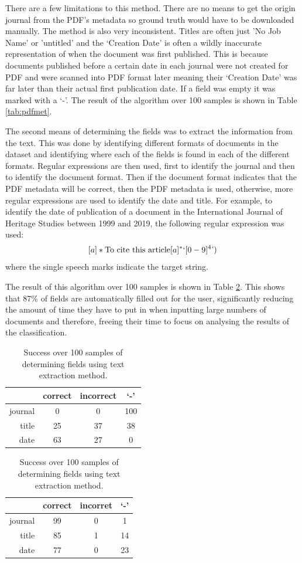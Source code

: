 				There are a few limitations to this method. There are no means to get the origin journal from the PDF's metadata so ground truth would have to be downloaded manually. The method is also very inconsistent. Titles are often just 'No Job Name' or 'untitled' and the `Creation Date' is often a wildly inaccurate representation of when the document was first published. This is because documents published before a certain date in each journal were not created for PDF and were scanned into PDF format later meaning their `Creation Date' was far later than their actual first publication date. If a field was empty it was marked with a `-'. The result of the algorithm over 100 samples is shown in Table \ref{tab:pdfmet}.
				
				The second means of determining the fields was to extract the information from the text. This was done by identifying different formats of documents in the dataset and identifying where each of the fields is found in each of the different formats. Regular expressions are then used, first to identify the journal and then to identify the document format. Then if the document format indicates that the PDF metadata will be correct, then the PDF metadata is used, otherwise, more regular expressions are used to identify the date and title. For example, to identify the date of publication of a document in the International Journal of Heritage Studies between 1999 and 2019, the following regular expression was used: \[[a]*\textnormal{To cite this article}[a]^*\textnormal{`}[0-9]^4\textnormal{'})\] where the single speech marks indicate the target string. 
				
				The result of this algorithm over 100 samples is shown in Table \ref{tab:textmet}. This shows that 87\% of fields are automatically filled out for the user, significantly reducing the amount of time they have to put in when inputting large numbers of documents and therefore, freeing their time to focus on analysing the results of the classification.
			\begin{table}
				\parbox{.45\linewidth}{
					\centering
					\begin{tabular}{r|c|c|c}
						\hline
						&correct&incorrect&`-'\\
						\hline
						journal&0&0&100\\
						title&25&37&38\\
						date&63&27&0
					\end{tabular}
					\caption{Success over 100 samples of determining fields using PDF method.}\label{tab:pdfmet}
				}
				\hfill
				\parbox{.45\linewidth}{
					\centering
					\begin{tabular}{r|c|c|c}
						\hline
						&correct&incorret&`-'\\
						\hline
						journal&99&0&1\\
						title&85&1&14\\
						date&77&0&23
					\end{tabular}
					\caption{Success over 100 samples of determining fields using text extraction method.}\label{tab:textmet}
				}
			\end{table}		
							
